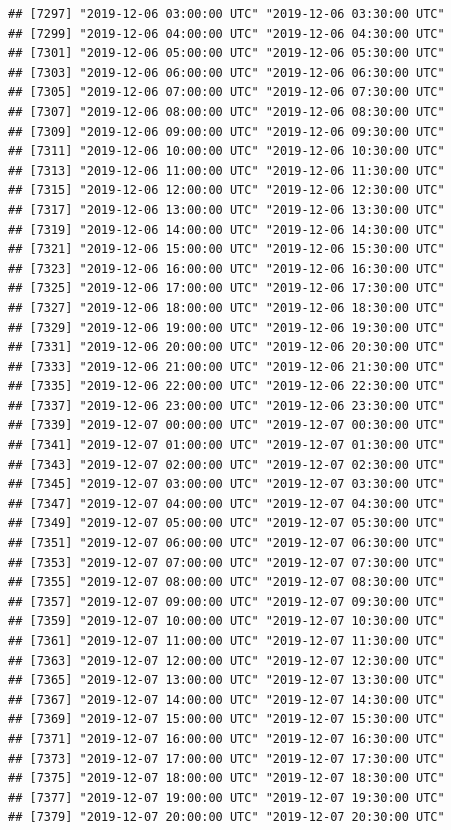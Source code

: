 \documentclass{article}\usepackage[]{graphicx}\usepackage[]{color}
\makeatletter
\newenvironment{kframe}{%
 \def\at@end@of@kframe{}%
 \ifinner\ifhmode%
  \def\at@end@of@kframe{\end{minipage}}%
  \begin{minipage}{\columnwidth}%
 \fi\fi%
 \def\FrameCommand##1{\hskip\@totalleftmargin \hskip-\fboxsep
 \colorbox{shadecolor}{##1}\hskip-\fboxsep
     \hskip-\linewidth \hskip-\@totalleftmargin \hskip\columnwidth}%
 \MakeFramed {\advance\hsize-\width
   \@totalleftmargin\z@ \linewidth\hsize
   \@setminipage}}%
 {\par\unskip\endMakeFramed%
 \at@end@of@kframe}
\newenvironment{knitrout}{}{} %
\makeatother
\begin{document}
\begin{knitrout}
\begin{kframe}
\begin{verbatim}
## [7297] "2019-12-06 03:00:00 UTC" "2019-12-06 03:30:00 UTC"
## [7299] "2019-12-06 04:00:00 UTC" "2019-12-06 04:30:00 UTC"
## [7301] "2019-12-06 05:00:00 UTC" "2019-12-06 05:30:00 UTC"
## [7303] "2019-12-06 06:00:00 UTC" "2019-12-06 06:30:00 UTC"
## [7305] "2019-12-06 07:00:00 UTC" "2019-12-06 07:30:00 UTC"
## [7307] "2019-12-06 08:00:00 UTC" "2019-12-06 08:30:00 UTC"
## [7309] "2019-12-06 09:00:00 UTC" "2019-12-06 09:30:00 UTC"
## [7311] "2019-12-06 10:00:00 UTC" "2019-12-06 10:30:00 UTC"
## [7313] "2019-12-06 11:00:00 UTC" "2019-12-06 11:30:00 UTC"
## [7315] "2019-12-06 12:00:00 UTC" "2019-12-06 12:30:00 UTC"
## [7317] "2019-12-06 13:00:00 UTC" "2019-12-06 13:30:00 UTC"
## [7319] "2019-12-06 14:00:00 UTC" "2019-12-06 14:30:00 UTC"
## [7321] "2019-12-06 15:00:00 UTC" "2019-12-06 15:30:00 UTC"
## [7323] "2019-12-06 16:00:00 UTC" "2019-12-06 16:30:00 UTC"
## [7325] "2019-12-06 17:00:00 UTC" "2019-12-06 17:30:00 UTC"
## [7327] "2019-12-06 18:00:00 UTC" "2019-12-06 18:30:00 UTC"
## [7329] "2019-12-06 19:00:00 UTC" "2019-12-06 19:30:00 UTC"
## [7331] "2019-12-06 20:00:00 UTC" "2019-12-06 20:30:00 UTC"
## [7333] "2019-12-06 21:00:00 UTC" "2019-12-06 21:30:00 UTC"
## [7335] "2019-12-06 22:00:00 UTC" "2019-12-06 22:30:00 UTC"
## [7337] "2019-12-06 23:00:00 UTC" "2019-12-06 23:30:00 UTC"
## [7339] "2019-12-07 00:00:00 UTC" "2019-12-07 00:30:00 UTC"
## [7341] "2019-12-07 01:00:00 UTC" "2019-12-07 01:30:00 UTC"
## [7343] "2019-12-07 02:00:00 UTC" "2019-12-07 02:30:00 UTC"
## [7345] "2019-12-07 03:00:00 UTC" "2019-12-07 03:30:00 UTC"
## [7347] "2019-12-07 04:00:00 UTC" "2019-12-07 04:30:00 UTC"
## [7349] "2019-12-07 05:00:00 UTC" "2019-12-07 05:30:00 UTC"
## [7351] "2019-12-07 06:00:00 UTC" "2019-12-07 06:30:00 UTC"
## [7353] "2019-12-07 07:00:00 UTC" "2019-12-07 07:30:00 UTC"
## [7355] "2019-12-07 08:00:00 UTC" "2019-12-07 08:30:00 UTC"
## [7357] "2019-12-07 09:00:00 UTC" "2019-12-07 09:30:00 UTC"
## [7359] "2019-12-07 10:00:00 UTC" "2019-12-07 10:30:00 UTC"
## [7361] "2019-12-07 11:00:00 UTC" "2019-12-07 11:30:00 UTC"
## [7363] "2019-12-07 12:00:00 UTC" "2019-12-07 12:30:00 UTC"
## [7365] "2019-12-07 13:00:00 UTC" "2019-12-07 13:30:00 UTC"
## [7367] "2019-12-07 14:00:00 UTC" "2019-12-07 14:30:00 UTC"
## [7369] "2019-12-07 15:00:00 UTC" "2019-12-07 15:30:00 UTC"
## [7371] "2019-12-07 16:00:00 UTC" "2019-12-07 16:30:00 UTC"
## [7373] "2019-12-07 17:00:00 UTC" "2019-12-07 17:30:00 UTC"
## [7375] "2019-12-07 18:00:00 UTC" "2019-12-07 18:30:00 UTC"
## [7377] "2019-12-07 19:00:00 UTC" "2019-12-07 19:30:00 UTC"
## [7379] "2019-12-07 20:00:00 UTC" "2019-12-07 20:30:00 UTC"

\end{verbatim}
\end{kframe}
\end{knitrout}
\end{document}

